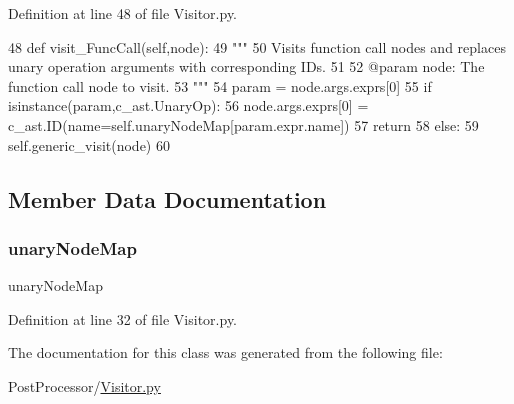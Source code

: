 Definition at line 48 of file Visitor.\+py.


\begin{DoxyCode}
48     \textcolor{keyword}{def }visit\_FuncCall(self,node):
49         \textcolor{stringliteral}{"""
}
50 \textcolor{stringliteral}{        Visits function call nodes and replaces unary operation arguments with corresponding IDs.
}
51 \textcolor{stringliteral}{
}
52 \textcolor{stringliteral}{        @param node: The function call node to visit.
}
53 \textcolor{stringliteral}{        """}
54         param = node.args.exprs[0]
55         \textcolor{keywordflow}{if} isinstance(param,c\_ast.UnaryOp):
56             node.args.exprs[0] = c\_ast.ID(name=self.unaryNodeMap[param.expr.name])
57             \textcolor{keywordflow}{return}
58         \textcolor{keywordflow}{else}:
59             self.generic\_visit(node)
60 
\end{DoxyCode}


\subsection{Member Data Documentation}
\mbox{\label{classPostProcessor_1_1Visitor_1_1UnaryOpNodeChanger_a45d99513007ccd4190a027d805a8d0db}} 
\subsubsection{\texorpdfstring{unary\+Node\+Map}{unaryNodeMap}}
{\footnotesize\ttfamily unary\+Node\+Map}



Definition at line 32 of file Visitor.\+py.



The documentation for this class was generated from the following file\+:\begin{DoxyCompactItemize}
\item 
Post\+Processor/\hyperlink{Visitor_8py}{Visitor.\+py}\end{DoxyCompactItemize}
